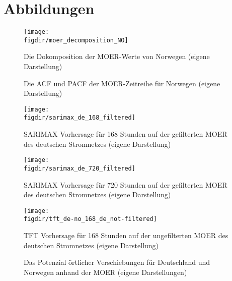 \chapter{Abbildungen}\label{CAP:append-figures}
\begin{figure}
    \caption[Dekomposition der MOER Norwegens]{Die Dokomposition der MOER-Werte von Norwegen (eigene Darstellung)}
    {\texttt{[image: \\figdir/moer\_decomposition\_NO]}}
    \label{FIG:moer_decomposition_NO}
\end{figure}

\begin{figure}
    \centering
    \qquad
    \caption[ACF und PACF der MOER von Norwegen]{Die ACF und PACF der MOER-Zeitreihe für Norwegen (eigene Darstellung)}%
    \label{FIG:acf_pacf_moer_no}%
\end{figure}

\begin{figure}
    \caption[SARIMAX 168h Vorhersage MOER Deutschland gefiltert]{SARIMAX Vorhersage für 168 Stunden auf der gefilterten MOER des deutschen Stromnetzes (eigene Darstellung)}
    {\texttt{[image: \\figdir/sarimax\_de\_168\_filtered]}}
    \label{FIG:sarimax_de_168_filtered}
\end{figure}
\begin{figure}
    \caption[SARIMAX 72h Vorhersage MOER Deutschland gefiltert]{SARIMAX Vorhersage für 720 Stunden auf der gefilterten MOER des deutschen Stromnetzes (eigene Darstellung)}
    {\texttt{[image: \\figdir/sarimax\_de\_720\_filtered]}}
    \label{FIG:sarimax_de_720_filtered}
\end{figure}
\begin{figure}
    \caption[TFT 168h Vorhersage MOER Deutschland gefiltert]{TFT Vorhersage für 168 Stunden auf der ungefilterten MOER des deutschen Stromnetzes (eigene Darstellung)}
    {\texttt{[image: \\figdir/tft\_de-no\_168\_de\_not-filtered]}}
    \label{FIG:TFT-168-de-plot}
\end{figure}

\begin{figure}
    \centering
    \qquad
    \qquad
    \caption[Potenzial örtlicher Verschiebungen zwischen Deutschland und Norwegen]{Das Potenzial örtlicher Verschiebungen für Deutschland und Norwegen anhand der MOER (eigene Darstellungen)}%
    \label{FIG:location-shifting-potential}%
\end{figure}



